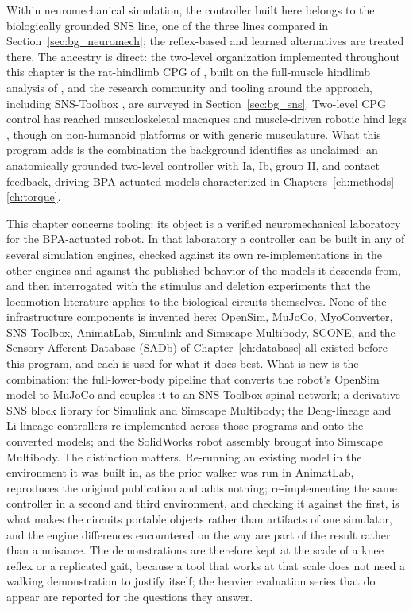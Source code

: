 Within neuromechanical simulation, the controller built here belongs to the biologically grounded SNS line, one of the three lines compared in Section~\ref{sec:bg_neuromech}; the reflex-based and learned alternatives \citep{geyer_musclereflex_2010, song_deep_2021} are treated there. The ancestry is direct: the two-level organization implemented throughout this chapter is the rat-hindlimb CPG of \citet{deng_neuromechanical_2019}, built on the full-muscle hindlimb analysis of \citet{young_analyzing_2019}, and the research community and tooling around the approach, including SNS-Toolbox \citep{nourse_sns_2023}, are surveyed in Section~\ref{sec:bg_sns}. Two-level CPG control has reached musculoskeletal macaques and muscle-driven robotic hind legs \citep{nishizaki_gait_2026, fukuoka_autonomous_2021}, though on non-humanoid platforms or with generic musculature. What this program adds is the combination the background identifies as unclaimed: an anatomically grounded two-level controller with Ia, Ib, group II, and contact feedback, driving BPA-actuated models characterized in Chapters~\ref{ch:methods}--\ref{ch:torque}.

This chapter concerns tooling: its object is a verified neuromechanical laboratory for the BPA-actuated robot. In that laboratory a controller can be built in any of several simulation engines, checked against its own re-implementations in the other engines and against the published behavior of the models it descends from, and then interrogated with the stimulus and deletion experiments that the locomotion literature applies to the biological circuits themselves. None of the infrastructure components is invented here: OpenSim, MuJoCo, MyoConverter, SNS-Toolbox, AnimatLab, Simulink and Simscape Multibody, SCONE, and the Sensory Afferent Database (SADb) of Chapter~\ref{ch:database} all existed before this program, and each is used for what it does best. What is new is the combination: the full-lower-body pipeline that converts the robot's OpenSim model to MuJoCo and couples it to an SNS-Toolbox spinal network; a derivative SNS block library for Simulink and Simscape Multibody; the Deng-lineage and Li-lineage controllers re-implemented across those programs and onto the converted models; and the SolidWorks robot assembly brought into Simscape Multibody. The distinction matters. Re-running an existing model in the environment it was built in, as the prior walker was run in AnimatLab, reproduces the original publication and adds nothing; re-implementing the same controller in a second and third environment, and checking it against the first, is what makes the circuits portable objects rather than artifacts of one simulator, and the engine differences encountered on the way are part of the result rather than a nuisance. The demonstrations are therefore kept at the scale of a knee reflex or a replicated gait, because a tool that works at that scale does not need a walking demonstration to justify itself; the heavier evaluation series that do appear are reported for the questions they answer.

